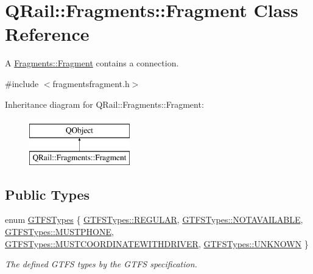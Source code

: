 \hypertarget{classQRail_1_1Fragments_1_1Fragment}{}\section{Q\+Rail\+::Fragments\+::Fragment Class Reference}
\label{classQRail_1_1Fragments_1_1Fragment}


A \mbox{\hyperlink{classQRail_1_1Fragments_1_1Fragment}{Fragments\+::\+Fragment}} contains a connection.  




{\ttfamily \#include $<$fragmentsfragment.\+h$>$}

Inheritance diagram for Q\+Rail\+::Fragments\+::Fragment\+:\begin{figure}[H]
\begin{center}
\leavevmode
\includegraphics[height=2.000000cm]{classQRail_1_1Fragments_1_1Fragment}
\end{center}
\end{figure}
\subsection*{Public Types}
\begin{DoxyCompactItemize}
\item 
enum \mbox{\hyperlink{classQRail_1_1Fragments_1_1Fragment_ae3c308ba6dec16f36ecc5dba59f35af3}{G\+T\+F\+S\+Types}} \{ \newline
\mbox{\hyperlink{classQRail_1_1Fragments_1_1Fragment_ae3c308ba6dec16f36ecc5dba59f35af3a820ead78f0fa32544c7ba38fe7ff53d9}{G\+T\+F\+S\+Types\+::\+R\+E\+G\+U\+L\+AR}}, 
\mbox{\hyperlink{classQRail_1_1Fragments_1_1Fragment_ae3c308ba6dec16f36ecc5dba59f35af3ae91bde0dd79ec49e6be53e755f5ee50d}{G\+T\+F\+S\+Types\+::\+N\+O\+T\+A\+V\+A\+I\+L\+A\+B\+LE}}, 
\mbox{\hyperlink{classQRail_1_1Fragments_1_1Fragment_ae3c308ba6dec16f36ecc5dba59f35af3af0ff2a305960c2e09841f026437832f2}{G\+T\+F\+S\+Types\+::\+M\+U\+S\+T\+P\+H\+O\+NE}}, 
\mbox{\hyperlink{classQRail_1_1Fragments_1_1Fragment_ae3c308ba6dec16f36ecc5dba59f35af3a1fe19352daa8176196020cda772e2eab}{G\+T\+F\+S\+Types\+::\+M\+U\+S\+T\+C\+O\+O\+R\+D\+I\+N\+A\+T\+E\+W\+I\+T\+H\+D\+R\+I\+V\+ER}}, 
\newline
\mbox{\hyperlink{classQRail_1_1Fragments_1_1Fragment_ae3c308ba6dec16f36ecc5dba59f35af3a696b031073e74bf2cb98e5ef201d4aa3}{G\+T\+F\+S\+Types\+::\+U\+N\+K\+N\+O\+WN}}
 \}
\begin{DoxyCompactList}\small\item\em The defined G\+T\+FS types by the G\+T\+FS specification. \end{DoxyCompactList}\end{DoxyCompactItemize}
